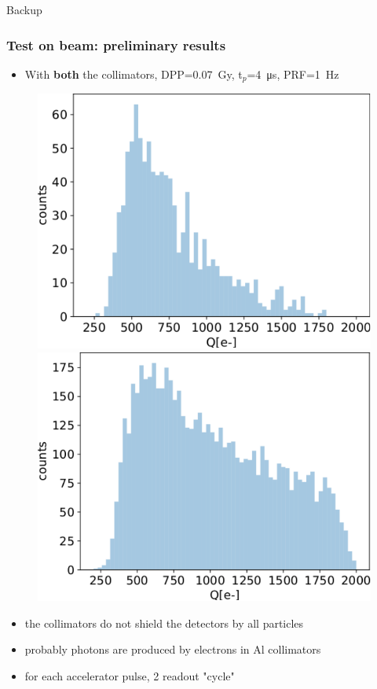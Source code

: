     \begin{frame}
        Backup        
    \end{frame} 



    \begin{frame}
        \frametitle{Test on beam: preliminary results}
        \begin{itemize}
            \item With \textbf{both} the collimators, DPP=\SI{0.07}{Gy}, t$_p$=\SI{4}{\us}, PRF=\SI{1}{Hz}
        \end{itemize}
        \medskip
        \begin{figure}
            \includegraphics[width=0.49\linewidth]{figures/test_beam/Q1_17_11.pdf}
            \includegraphics[width=.49\linewidth]{figures/test_beam/Q2_17_11.pdf}
        \end{figure}
        \begin{itemize}
            \item the collimators do not shield the detectors by all particles
            \item probably photons are produced by electrons in Al collimators
            \item for each accelerator pulse, 2 readout "cycle"  
        \end{itemize}
    \end{frame} 
    
